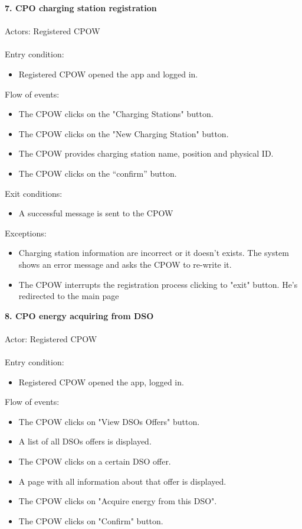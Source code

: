 \documentclass[a4paper]{report}
\begin{document}
\textbf{7. CPO charging station registration}\label{uc:1}
\\
\\
Actors: Registered CPOW\\ \\
Entry condition:
\begin{itemize}
\item Registered CPOW opened the app and logged in.
\end{itemize}
Flow of events:
\begin{itemize}
\item The CPOW clicks on the "Charging Stations" button.
\item The CPOW clicks on the "New Charging Station" button.
\item The CPOW provides charging station name, position and physical ID.
\item The CPOW clicks on the “confirm” button.
\end{itemize}
Exit conditions:
\begin{itemize}
\item A successful message is sent to the CPOW
\end{itemize}
Exceptions:
\begin{itemize}
\item Charging station information are incorrect or it doesn't exists. The system shows an error message and asks the CPOW to re-write it.
\item The CPOW interrupts the registration process clicking to "exit" button. He's redirected to the main page
\end{itemize}
\textbf{8. CPO energy acquiring from DSO}\label{uc:8}
\\ \\
Actor: Registered CPOW \\ \\
Entry condition:
\begin{itemize}
\item Registered CPOW opened the app, logged in.
\end{itemize}
Flow of events:
\begin{itemize}
\item The CPOW clicks on "View DSOs Offers" button.
\item A list of all DSOs offers is displayed.
\item The CPOW clicks on a certain DSO offer.
\item A page with all information about that offer is displayed.
\item The CPOW clicks on "Acquire energy from this DSO".
\item The CPOW clicks on "Confirm" button.
\end{itemize}
\end{document}
